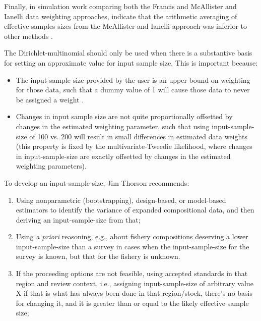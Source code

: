 Finally, in simulation work comparing both the Francis and McAllister and Ianelli data weighting approaches, indicate that the arithmetic averaging of effective samples sizes from the McAllister and Ianelli approach was inferior to other methods \citep{punt_insights_2016}.

\hypertarget{DM}{}

The Dirichlet-multinomial should only be used when there is a
substantive basis for setting an approximate value for input sample
size.  This is important because: 

\begin{itemize}

\item The input-sample-size provided by the user is an upper bound on
weighting for those data, such that a dummy value of 1 will cause those
data to never be assigned a weight .

\item Changes in input sample size are not quite proportionally
offsetted by changes in the estimated weighting parameter, such that
using input-sample-size of 100 vs. 200 will result in small differences
in estimated data weights (this property is fixed by the
multivariate-Tweedie likelihood, where changes in input-sample-size are
exactly offsetted by changes in the estimated weighting parameters).   

\end{itemize}

To develop an input-sample-size, Jim Thorson recommends:

\begin{enumerate}

\item Using nonparametric (bootstrapping), design-based, or model-based
estimators to identify the variance of expanded compositional data, and
then deriving an input-sample-size from that; 

\item Using \textit{a priori} reasoning, e.g., about fishery compositions
deserving a lower input-sample-size than a survey in cases when the
input-sample-size for the survey is known, but that for the fishery is
unknown. 

\item If the proceeding options are not feasible, using accepted
standards in that region and review context, i.e., assigning
input-sample-size of arbitrary value X if that is what has always been
done in that region/stock, there’s no basis for changing it, and it is
greater than or equal to the likely effective sample size; 

\end{enumerate}

